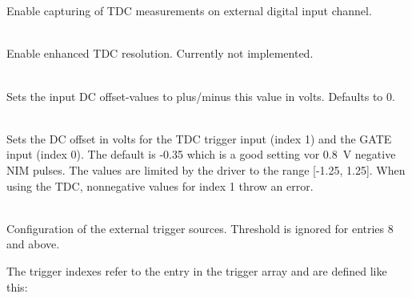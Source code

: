             \\
            \\
            Enable capturing of TDC measurements on external digital input channel.\par

            \\
            Enable enhanced TDC resolution. Currently not implemented.\par

            \\
            Sets the input DC offset-values to plus/minus this value in volts. Defaults to 0.\par

            \\
            Sets the DC offset in volts for the TDC trigger input (index 1) and the GATE input (index 0). The default is -0.35 which is a good setting vor \SI{0.8}{\volt} negative NIM pulses.
            The values are limited by the driver to the range [-1.25, 1.25]. When using the TDC, nonnegative values for index 1 throw an error. \par

            \\
            Configuration of the external trigger sources. Threshold is ignored for entries 8 and above.\par

            The trigger indexes refer to the entry in the trigger array and are defined like this:\par

            \\
            \\
            \\
            \\
            \\
            \\
            \\
            \\
            \\
            \\
            \\
            \\
            \\
            \\
            \par

